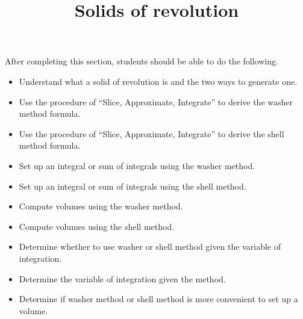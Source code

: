 \documentclass{ximera}
\title{Solids of revolution}
\begin{document}
\begin{abstract}
\end{abstract}

\maketitle

\begin{sectionOutcomes}

After completing this section, students should be able to do the following.

\begin{itemize}
\item Understand what a solid of revolution is and the two ways to generate one.
\item Use the procedure of ``Slice, Approximate, Integrate'' to derive the washer method formula.
\item Use the procedure of ``Slice, Approximate, Integrate'' to derive the shell method formula.
\item Set up an integral or sum of integrals using the washer method.
\item Set up an integral or sum of integrals using the shell method.
\item Compute volumes using the washer method.
\item Compute volumes using the shell method.
\item Determine whether to use washer or shell method given the variable of integration.
\item Determine the variable of integration given the method.
\item Determine if washer method or shell method is more convenient to set up a volume.
\end{itemize}

\end{sectionOutcomes}
\end{document}
